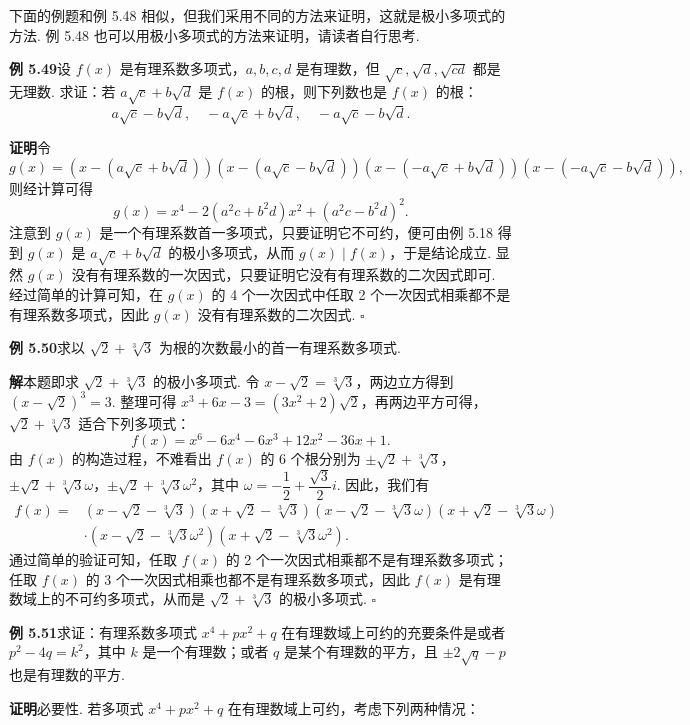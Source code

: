 \documentclass[UTF8,12pt,a4paper,fontset=fandol]{ctexart}
\begin{document}
下面的例题和例 5.48 相似，但我们采用不同的方法来证明，这就是极小多项式的方法. 例 5.48 也可以用极小多项式的方法来证明，请读者自行思考.

\noindent\textbf{例 5.49}\quad 设 $f(x)$ 是有理系数多项式，$a,b,c,d$ 是有理数，但 $\sqrt c,\sqrt d,\sqrt{cd}$ 都是无理数. 求证：若 $a\sqrt c+b\sqrt d$ 是 $f(x)$ 的根，则下列数也是 $f(x)$ 的根：
\[
a\sqrt c-b\sqrt d,\quad -a\sqrt c+b\sqrt d,\quad -a\sqrt c-b\sqrt d.
\]

\noindent\textbf{证明}\quad 令
\[
g(x)=(x-(a\sqrt c+b\sqrt d))(x-(a\sqrt c-b\sqrt d))(x-(-a\sqrt c+b\sqrt d))(x-(-a\sqrt c-b\sqrt d)),
\]
则经计算可得
\[
g(x)=x^4-2(a^2c+b^2d)x^2+(a^2c-b^2d)^2.
\]
注意到 $g(x)$ 是一个有理系数首一多项式，只要证明它不可约，便可由例 5.18 得到 $g(x)$ 是 $a\sqrt c+b\sqrt d$ 的极小多项式，从而 $g(x)\mid f(x)$，于是结论成立. 显然 $g(x)$ 没有有理系数的一次因式，只要证明它没有有理系数的二次因式即可. 经过简单的计算可知，在 $g(x)$ 的 4 个一次因式中任取 2 个一次因式相乘都不是有理系数多项式，因此 $g(x)$ 没有有理系数的二次因式. \hfill $\square$

\noindent\textbf{例 5.50}\quad 求以 $\sqrt2+\sqrt[3]{3}$ 为根的次数最小的首一有理系数多项式.

\noindent\textbf{解}\quad 本题即求 $\sqrt2+\sqrt[3]{3}$ 的极小多项式. 令 $x-\sqrt2=\sqrt[3]{3}$，两边立方得到 $(x-\sqrt2)^3=3$. 整理可得 $x^3+6x-3=(3x^2+2)\sqrt2$，再两边平方可得，$\sqrt2+\sqrt[3]{3}$ 适合下列多项式：
\[
f(x)=x^6-6x^4-6x^3+12x^2-36x+1.
\]
由 $f(x)$ 的构造过程，不难看出 $f(x)$ 的 6 个根分别为 $\pm\sqrt2+\sqrt[3]{3}$，$\pm\sqrt2+\sqrt[3]{3}\omega$，$\pm\sqrt2+\sqrt[3]{3}\omega^2$，其中 $\omega=-\dfrac12+\dfrac{\sqrt3}{2}i$. 因此，我们有
\[
\begin{aligned}
f(x)={}&(x-\sqrt2-\sqrt[3]{3})(x+\sqrt2-\sqrt[3]{3})(x-\sqrt2-\sqrt[3]{3}\omega)(x+\sqrt2-\sqrt[3]{3}\omega)\\
&\cdot (x-\sqrt2-\sqrt[3]{3}\omega^2)(x+\sqrt2-\sqrt[3]{3}\omega^2).
\end{aligned}
\]
通过简单的验证可知，任取 $f(x)$ 的 2 个一次因式相乘都不是有理系数多项式；任取 $f(x)$ 的 3 个一次因式相乘也都不是有理系数多项式，因此 $f(x)$ 是有理数域上的不可约多项式，从而是 $\sqrt2+\sqrt[3]{3}$ 的极小多项式. \hfill $\square$

\noindent\textbf{例 5.51}\quad 求证：有理系数多项式 $x^4+px^2+q$ 在有理数域上可约的充要条件是或者 $p^2-4q=k^2$，其中 $k$ 是一个有理数；或者 $q$ 是某个有理数的平方，且 $\pm2\sqrt q-p$ 也是有理数的平方.

\noindent\textbf{证明}\quad 必要性. 若多项式 $x^4+px^2+q$ 在有理数域上可约，考虑下列两种情况：
\end{document}
